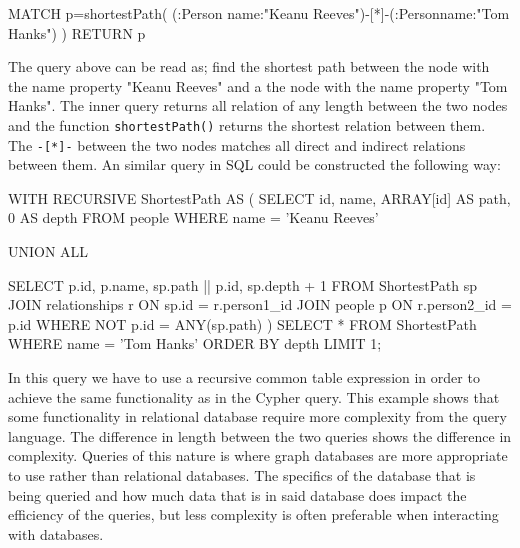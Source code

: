 \begin{sqlCode}
MATCH p=shortestPath(
(:Person {name:"Keanu Reeves"})-[*]-(:Person{name:"Tom Hanks"})
) RETURN p
\end{sqlCode}

The query above can be read as; find the shortest path between the node with the name property "Keanu Reeves" and a the node with the name property "Tom Hanks". The inner query returns all relation of any length between the two nodes and the function \texttt{shortestPath()} returns the shortest relation between them. The \texttt{-[*]-} between the two nodes matches all direct and indirect relations between them. An similar query in SQL could be constructed the following way:
\begin{sqlCode}
WITH RECURSIVE ShortestPath AS (
SELECT
  id,
  name,
  ARRAY[id] AS path,
  0 AS depth
FROM
  people
WHERE
  name = 'Keanu Reeves'

UNION ALL

SELECT
  p.id,
  p.name,
  sp.path || p.id,
  sp.depth + 1
FROM
  ShortestPath sp
JOIN
  relationships r ON sp.id = r.person1_id
JOIN
  people p ON r.person2_id = p.id
WHERE
  NOT p.id = ANY(sp.path)
  )
SELECT *
FROM ShortestPath
WHERE name = 'Tom Hanks'
ORDER BY depth
LIMIT 1;

\end{sqlCode}
In this query we have to use a recursive common table expression in order to achieve the same functionality as in the Cypher query. This example shows that some functionality in relational database require more complexity from the query language. The difference in length between the two queries shows the difference in complexity. Queries of this nature is where graph databases are more appropriate to use rather than relational databases. The specifics of the database that is being queried and how much data that is in said database does impact the efficiency of the queries, but less complexity is often preferable when interacting with databases.



